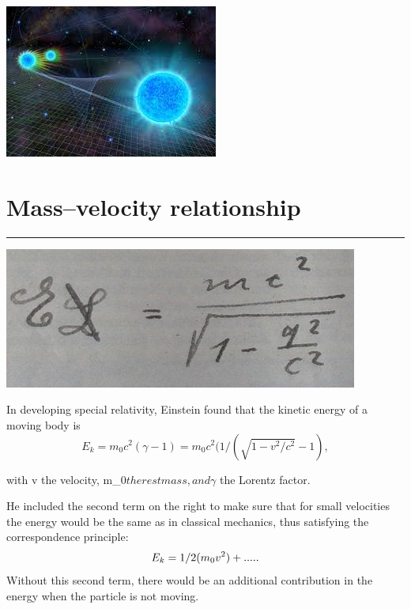 \documentclass{article}
\begin{document}
     
     
\vspace{5pt}

\vspace{15pt}
\begin{center}
 \includegraphics{images/image1.jpeg}   
\end{center}


\pagebreak

\section{Mass–velocity relationship}
\hrule
\vspace{25pt}
\begin{center}
    \includegraphics{images/image2.jpeg}
\end{center}
In developing special relativity, Einstein found that the kinetic energy of a moving body is
\vspace{10pt}
\begin{equation}
    E_k=m_0c^2(\gamma - 1 ) = m_0c^2(1/(\sqrt{1-v^2/c^2}-1) ,
    \end{equation}
    
    with v the velocity, m_0$ the rest mass, and \gamma$ the  Lorentz factor.

\vspace{10pt}

He included the second term on the right to make sure that for small velocities the energy would be the same as in classical mechanics, thus satisfying the correspondence principle:
\begin{equation}
    \vspace{10pt}
    E_k=1/2(m_0v^2)+.....    
\end{equation}
Without this second term, there would be an additional contribution in the energy when the particle is not moving.
\end{document}
